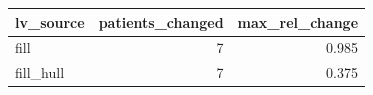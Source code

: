 \begin{tabular}{lrr}
\toprule
lv\_source & patients\_changed & max\_rel\_change \\
\midrule
fill & 7 & 0.985 \\
fill\_hull & 7 & 0.375 \\
\bottomrule
\end{tabular}
